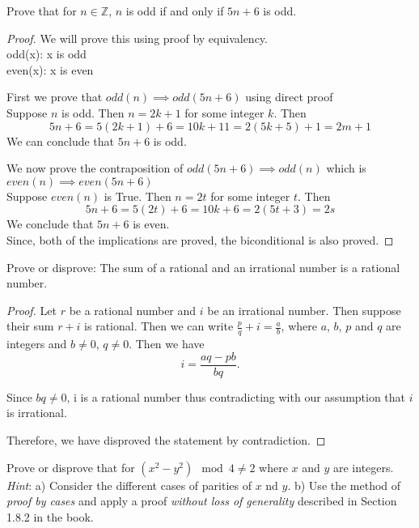 \documentclass[a4paper]{exam}
\theoremstyle{definition}
\newcommand\Z{\ensuremath{\mathbb{Z}}}
\begin{document}
\begin{questions}

\question Prove that for $n\in\Z$, $n$ is odd if and only if $5n + 6$ is odd.

  \begin{solution}
    \begin{proof}
We will prove this using proof by equivalency.\\
odd(x): x is odd\\
even(x): x is even

First we prove that $odd(n) \implies odd(5n+6)$ using direct proof\\
Suppose $n$ is odd. Then $n = 2k + 1$ for some integer $k$. Then
\[
5n + 6 = 5(2k + 1) + 6 = 10k + 11 = 2(5k + 5) + 1 = 2m + 1
\]
We can conclude that $5n + 6$ is odd.

We now prove the contraposition of $odd(5n+6) \implies odd(n)$ which is\\ $even(n) \implies even(5n+6)$\\
Suppose $even(n)$ is True. Then $n = 2t$ for some integer $t$. Then
\[
5n + 6 = 5(2t) + 6 = 10k + 6 = 2(5t + 3) = 2s
\]
We conclude that $5n+6$ is even.\\
Since, both of the implications are proved, the biconditional is also proved.
\end{proof}

  \end{solution}

\question Prove or disprove: The sum of a rational and an irrational number is a rational number.

  \begin{solution}
    \begin{proof}
    Let $r$ be a rational number and $i$ be an irrational number. Then suppose their sum $r + i$ is rational. Then we can write $\frac{p}{q} + i = \frac{a}{b}$, where $a$, $b$, $p$ and $q$ are integers and $b \neq 0$, $q\neq0$. Then we have
\[
i = \frac{aq - pb}{bq}.
\]

Since $bq \neq 0$, i is a rational number thus contradicting with our assumption that $i$ is irrational.

Therefore, we have disproved the statement by contradiction.
\end{proof}
    \end{solution}
  
\question Prove or disprove that for $(x^2 - y^2) \mod 4 \neq 2$ where $x$ and $y$ are integers.\\
  \textit{Hint}: a) Consider the different cases of parities of $x$ nd $y$. b) Use the method of \textit{proof by cases} and apply a proof \textit{without loss of generality} described in Section 1.8.2 in the book.


\end{questions}
\end{document}

